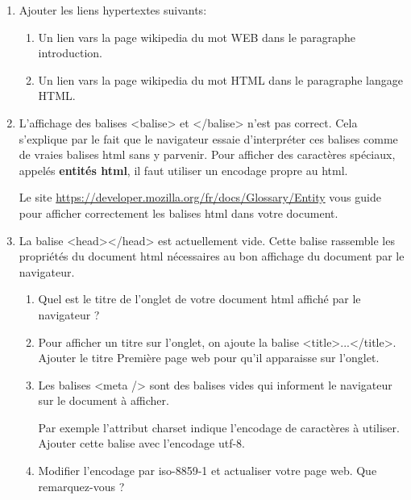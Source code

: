 \documentclass[11pt,a4paper]{article}
\newcounter{num}
\newcounter{rem}
\begin{document}
\begin{enumerate}
\item Ajouter les liens hypertextes suivants:
\begin{enumerate}
\item Un lien vars la page wikipedia du mot \textsf{WEB} dans le paragraphe introduction.
\item Un lien vars la page wikipedia du mot \textsf{HTML} dans le paragraphe langage HTML.
\end{enumerate}

\item L'affichage des balises \textsf{<balise>} et \textsf{</balise>} n'est pas correct. Cela s'explique par le fait que le navigateur essaie d'interpréter ces balises comme de vraies balises html sans y parvenir. Pour afficher des caractères spéciaux, appelés \textbf{entités html}, il faut utiliser un encodage propre au html.

Le site \url{https://developer.mozilla.org/fr/docs/Glossary/Entity} vous guide pour afficher correctement les balises html dans votre document.

\newpage
\item La balise \textsf{<head></head>} est actuellement vide. Cette balise rassemble les propriétés du document html nécessaires au bon affichage du document par le navigateur.

\begin{enumerate}
\item Quel est le titre de l'onglet de votre document html affiché par le navigateur ?

\item Pour afficher un titre sur l'onglet, on ajoute la balise \textsf{<title>...</title>}. Ajouter le titre \textsf{Première page web} pour qu'il apparaisse sur l'onglet.

\item Les balises \textsf{<meta />} sont des balises vides qui informent le navigateur sur le document à afficher. 

Par exemple l'attribut \textsf{charset} indique l'encodage de caractères à utiliser. Ajouter cette balise avec l'encodage \textsf{utf-8}.

\item Modifier l'encodage par \textsf{iso-8859-1} et actualiser votre page web. Que remarquez-vous ?


\end{enumerate}
\end{enumerate}
\end{document}
